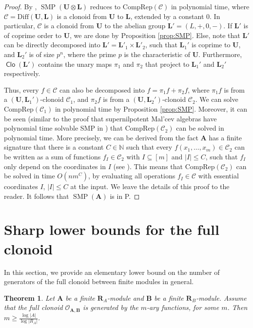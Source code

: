 \documentclass[11pt]{amsart}
\theoremstyle{plain}
\newtheorem{theorem}[thm]{Theorem}
\theoremstyle{definition}
\newcommand{\N}{{\mathbb N}}
\newcommand{\alg}[1]{\mathbf{#1}}
\newcommand{\clone}[1]{\mathcal{#1}}
\newcommand{\clonoid}[1]{\mathcal{#1}}
\newcommand{\clodC}{\clonoid{C}}
\newcommand{\clodO}{\clonoid{O}}
\newcommand{\algA}{\alg{A}}
\newcommand{\algB}{\alg{B}}
\newcommand{\algL}{\alg{L}}
\newcommand{\algR}{\alg{R}}
\newcommand{\algU}{\alg{U}}
\newcommand{\cloC}{\clone{C}}
\DeclareMathOperator{\Clo}{\mathsf{Clo}}
\DeclareMathOperator{\SMP}{SMP}
\begin{document}
\begin{proof}
By \cite[Theorem 10]{kompatscher-SMP2nil}, $\SMP(\algU \otimes \algL)$ reduces to $\mathrm{CompRep}(\clodC)$ in polynomial time, where $\clodC = \mathrm{Diff}(\algU,\algL)$ is a clonoid from $\algU$ to $\algL$, extended by a constant $0$. In particular, $\clodC$ is a clonoid from $\algU$ to the abelian group $\algL' =(L,+,0,-)$. If $\algL'$ is of coprime order to $\algU$, we are done by Proposition \ref{prop:SMP}. Else, note that $\algL'$ can be directly decomposed into $\algL' = \algL'_1\times \algL'_2$, such that $\algL_1'$ is coprime to $\algU$, and $\algL_2'$ is of size $p^n$, where the prime $p$ is the characteristic of $\algU$. Furthermore, $\Clo(\algL')$ contains the unary maps $\pi_1$ and $\pi_2$ that project to $\algL_1'$ and $\algL_2'$ respectively. 

Thus, every $f \in \clodC$ can also be decomposed into $f = \pi_1 f + \pi_2 f$, where $\pi_1 f$ is from a $(\algU,\algL_1')$-clonoid $\clodC_1$, and $\pi_2 f$ is from a $(\algU,\algL_2')$-clonoid $\clodC_2$. We can solve $\mathrm{CompRep}(\clodC_1)$ in polynomial time by Proposition \ref{prop:SMP}. Moreover, it can be seen (similar to the proof that supernilpotent Mal'cev algebras have polynomial time solvable SMP in \cite{mayr-SMP}) that $\mathrm{CompRep}(\clodC_2)$ can be solved in polynomial time. More precisely, we can be derived from the fact $\algA$ has a finite signature that there is a constant $C \in \N$ such that every $f(x_1,\ldots,x_m) \in \clodC_2$ can be written as a sum of functions $f_I \in \clodC_2$ with $I \subseteq [m]$ and $|I|\leq C$, such that $f_I$ only depend on the coordinates in $I$ (see \cite[Proof of Theorem 6.1]{KKK-CEQV2nil}). This means that $\mathrm{CompRep}(\clodC_2)$ can be solved in time $O(nm^C)$, by evaluating all operations $f_I \in \cloC$ with essential coordinates $I$, $|I|\leq C$ at the input. We leave the details of this proof to the reader. It follows that $\SMP(\algA)$ is in P.
\end{proof}

\section{Sharp lower bounds for the full clonoid}\label{sec:lowerbound}

In this section, we provide an elementary lower bound on the number of generators of the full clonoid between finite modules in general. 

\begin{theorem} \label{theorem:lowerbounds}
Let $\algA$ be a finite $\algR_A$-module and $\algB$ be a finite $\algR_B$-module. Assume that the full clonoid $\clodO_{\algA,\algB}$ is generated by the $m$-ary functions, for some $m$. Then $m \geq \frac{\log|A|}{\log|R_A|}$. 
\end{theorem} 
\end{document}

